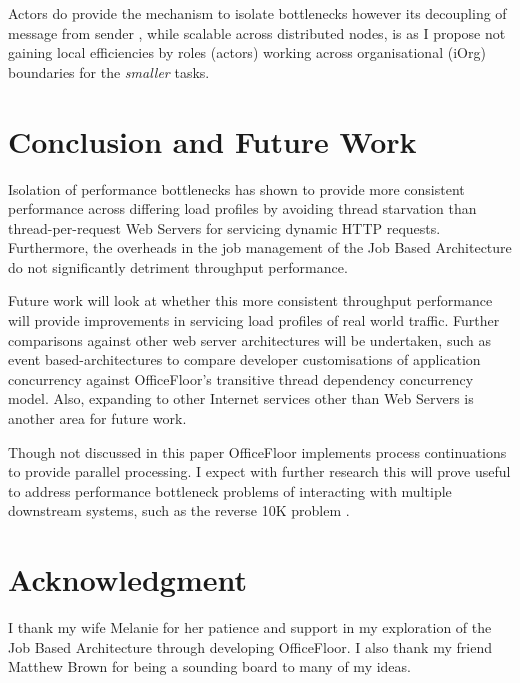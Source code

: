 \documentclass[conference]{ieee/IEEEtran}
\begin{document}
Actors do provide the mechanism to isolate bottlenecks however its decoupling
of message from sender \cite{actors}, while scalable across distributed nodes, is
as I propose not gaining local efficiencies by roles (actors) working across
organisational (iOrg) boundaries for the \textit{smaller} tasks.


\section{Conclusion and Future Work}
Isolation of performance bottlenecks has shown to provide more consistent
performance across differing load profiles by avoiding thread starvation than
thread-per-request Web Servers for servicing dynamic HTTP requests.
Furthermore, the overheads in the job management of the Job Based Architecture
do not significantly detriment throughput performance.

Future work will look at whether this more consistent throughput performance
will provide improvements in servicing load profiles of real world traffic.
Further comparisons against other web server architectures will be undertaken,
such as event based-architectures to compare developer customisations of
application concurrency against OfficeFloor's transitive thread dependency
concurrency model.  Also, expanding to other Internet services other than Web
Servers is another area for future work.

Though not discussed in this paper OfficeFloor implements process continuations
\cite{process-continuation} to provide parallel processing.  I expect with
further research this will prove useful to address performance bottleneck
problems of interacting with multiple downstream systems, such as the reverse
10K problem \cite{reverse-ten-k-problem}.









\section*{Acknowledgment} I thank my wife Melanie for her patience and support
in my exploration of the Job Based Architecture through developing OfficeFloor. 
I also thank my friend Matthew Brown for being a sounding board to many of my
ideas.
\end{document}
